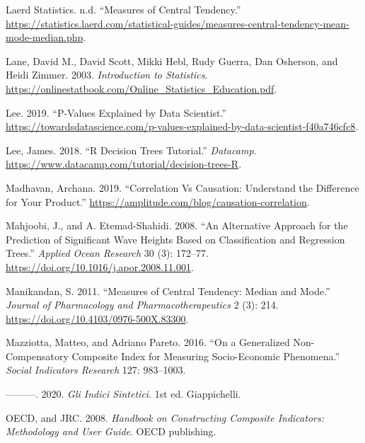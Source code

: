 \documentclass[
]{article}
\newlength{\cslhangindent}
\newlength{\cslentryspacingunit} %
\newenvironment{CSLReferences}[2] %
 {%
  \setlength{\parindent}{0pt}
  \ifodd #1
  \let\oldpar\par
  \def\par{\hangindent=\cslhangindent\oldpar}
  \fi
  \setlength{\parskip}{#2\cslentryspacingunit}
 }%
 {}
\begin{document}
\begin{CSLReferences}{1}{0}
\leavevmode{}%
Laerd Statistics. n.d. {``Measures of Central Tendency.''} \url{https://statistics.laerd.com/statistical-guides/measures-central-tendency-mean-mode-median.php}.

\leavevmode{}%
Lane, David M., David Scott, Mikki Hebl, Rudy Guerra, Dan Osherson, and Heidi Zimmer. 2003. \emph{Introduction to Statistics}. \url{https://onlinestatbook.com/Online_Statistics_Education.pdf}.

\leavevmode{}%
Lee. 2019. {``P-Values Explained by Data Scientist.''} \url{https://towardsdatascience.com/p-values-explained-by-data-scientist-f40a746cfc8}.

\leavevmode{}%
Lee, James. 2018. {``R Decision Trees Tutorial.''} \emph{Datacamp}. \url{https://www.datacamp.com/tutorial/decision-trees-R}.

\leavevmode{}%
Madhavan, Archana. 2019. {``Correlation Vs Causation: Understand the Difference for Your Product.''} \url{https://amplitude.com/blog/causation-correlation}.

\leavevmode{}%
Mahjoobi, J., and A. Etemad-Shahidi. 2008. {``An Alternative Approach for the Prediction of Significant Wave Heights Based on Classification and Regression Trees.''} \emph{Applied Ocean Research} 30 (3): 172--77. \url{https://doi.org/10.1016/j.apor.2008.11.001}.

\leavevmode{}%
Manikandan, S. 2011. {``Measures of Central Tendency: Median and Mode.''} \emph{Journal of Pharmacology and Pharmacotherapeutics} 2 (3): 214. \url{https://doi.org/10.4103/0976-500X.83300}.

\leavevmode{}%
Mazziotta, Matteo, and Adriano Pareto. 2016. {``On a Generalized Non-Compensatory Composite Index for Measuring Socio-Economic Phenomena.''} \emph{Social Indicators Research} 127: 983--1003.

\leavevmode{}%
---------. 2020. \emph{Gli Indici Sintetici}. 1st ed. Giappichelli.

\leavevmode{}%
OECD, and JRC. 2008. \emph{Handbook on Constructing Composite Indicators: Methodology and User Guide}. OECD publishing.


\end{CSLReferences}
\end{document}
